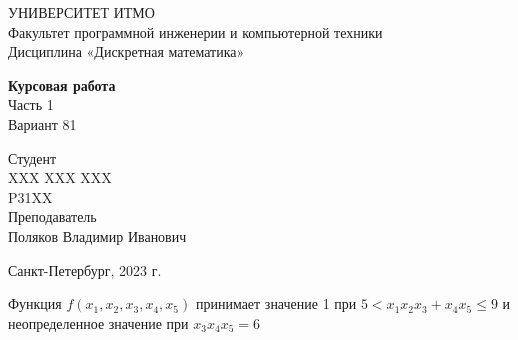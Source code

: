 \documentclass{article}
\begin{document}
\begin{center}
    УНИВЕРСИТЕТ ИТМО \\
    Факультет программной инженерии и компьютерной техники \\
    Дисциплина «Дискретная математика»
    
    \vspace{5cm}

    \large
    \textbf{Курсовая работа} \\
    Часть 1 \\
    Вариант 81
\end{center}

\vspace{2cm}

\hfill\begin{minipage}{0.35\linewidth}
Студент \\
XXX XXX XXX \\
P31XX \\

Преподаватель \\
Поляков Владимир Иванович
\end{minipage}

\vfill

\begin{center}
    Санкт-Петербург, 2023 г.
\end{center}

\thispagestyle{empty}
\newpage

Функция $f(x_1, x_2, x_3, x_4, x_5)$ принимает значение 1 при $5 < x_1 x_2 x_3 + x_4 x_5 \le 9$ и неопределенное значение при $x_3 x_4 x_5 = 6$
\end{document}
